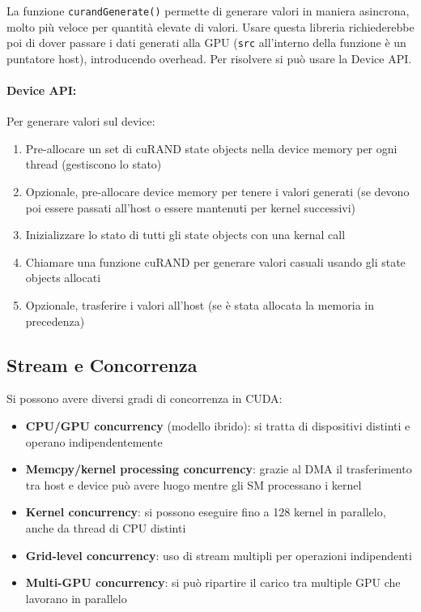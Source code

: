 La funzione \texttt{curandGenerate()} permette di generare valori in maniera asincrona, molto più veloce per quantità elevate di valori. Usare questa libreria richiederebbe poi di dover passare i dati generati alla GPU (\texttt{src} all'interno della funzione è un puntatore host), introducendo overhead. Per risolvere si può usare la Device API.

\paragraph{Device API:} Per generare valori sul device: 
\begin{enumerate}
	\item Pre-allocare un set di cuRAND state objects nella device memory per ogni thread (gestiscono lo stato)

	\item Opzionale, pre-allocare device memory per tenere i valori generati (se devono poi essere passati all'host o essere mantenuti per kernel successivi)

	\item Inizializzare lo stato di tutti gli state objects con una kernal call

	\item Chiamare una funzione cuRAND per generare valori casuali usando gli state objects allocati

	\item Opzionale, trasferire i valori all'host (se è stata allocata la memoria in precedenza)
\end{enumerate}

\subsection{Stream e Concorrenza}

Si possono avere diversi gradi di concorrenza in CUDA: 
\begin{itemize}
	\item \textbf{CPU/GPU concurrency} (modello ibrido): si tratta di dispositivi distinti e operano indipendentemente
	
	\item \textbf{Memcpy/kernel processing concurrency}: grazie al DMA il trasferimento tra host e device può avere luogo mentre gli SM processano i kernel
	
	\item \textbf{Kernel concurrency}: si possono eseguire fino a 128 kernel in parallelo, anche da thread di CPU distinti
	
	\item \textbf{Grid-level concurrency}: uso di stream multipli per operazioni indipendenti
	
	\item \textbf{Multi-GPU concurrency}: si può ripartire il carico tra multiple GPU che lavorano in parallelo
\end{itemize}

